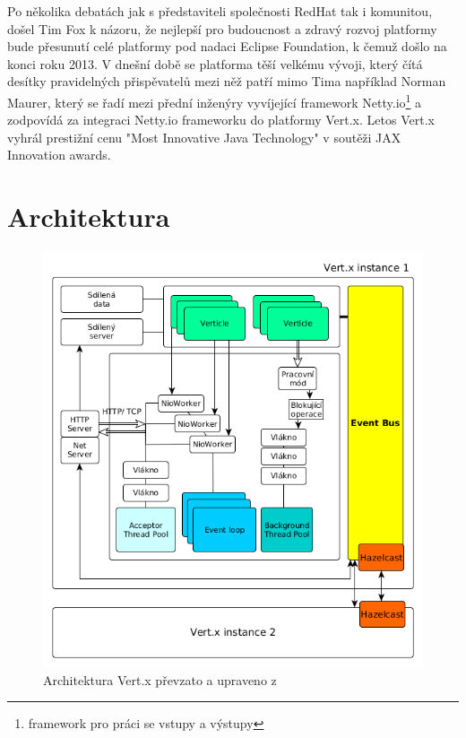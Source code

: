 Po několika debatách jak s představiteli společnosti RedHat tak i komunitou, došel Tim Fox k názoru, že nejlepší pro budoucnost a zdravý rozvoj platformy bude přesunutí celé platformy pod nadaci Eclipse Foundation, k čemuž došlo na konci roku 2013. V dnešní době se platforma těší velkému vývoji, který čítá desítky  pravidelných přispěvatelů mezi něž patří mimo Tima například Norman Maurer, který se řadí mezi přední inženýry vyvíjející framework Netty.io\footnote{framework pro práci se vstupy a výstupy} a zodpovídá za integraci Netty.io frameworku do platformy Vert.x\cite{vertxNodejs}.
Letos Vert.x vyhrál prestižní cenu "Most Innovative Java Technology" v soutěži JAX Innovation awards\citep{JAX}.

\section{Architektura}

\begin{figure}[h]
\begin{centering}
\includegraphics[scale=0.55]{obrazky/architecture_vertx}
\par\end{centering}
\caption{Architektura Vert.x převzato a upraveno z \cite{vertxArchitectureDiagram} \label{fig:vertxArchitectureDiagram}}
\end{figure}

